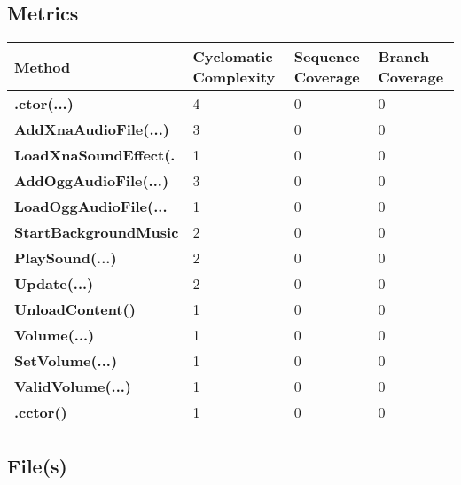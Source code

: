 \documentclass[a4paper,10pt]{article}
\begin{document}
\subsection{Metrics}
\begin{longtable}[l]{|l|l|l|l|}
\hline
\textbf{Method} & \textbf{Cyclomatic Complexity} & \textbf{Sequence Coverage} & \textbf{Branch Coverage}\\
\hline
\textbf{.ctor(...)} & 4 & 0 & 0\\
\hline
\textbf{AddXnaAudioFile(...)} & 3 & 0 & 0\\
\hline
\textbf{LoadXnaSoundEffect(.} & 1 & 0 & 0\\
\hline
\textbf{AddOggAudioFile(...)} & 3 & 0 & 0\\
\hline
\textbf{LoadOggAudioFile(...} & 1 & 0 & 0\\
\hline
\textbf{StartBackgroundMusic} & 2 & 0 & 0\\
\hline
\textbf{PlaySound(...)} & 2 & 0 & 0\\
\hline
\textbf{Update(...)} & 2 & 0 & 0\\
\hline
\textbf{UnloadContent()} & 1 & 0 & 0\\
\hline
\textbf{Volume(...)} & 1 & 0 & 0\\
\hline
\textbf{SetVolume(...)} & 1 & 0 & 0\\
\hline
\textbf{ValidVolume(...)} & 1 & 0 & 0\\
\hline
\textbf{.cctor()} & 1 & 0 & 0\\
\hline
\end{longtable}
\subsection{File(s)}
\end{document}
